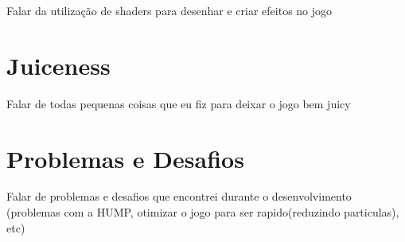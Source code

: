 Falar da utilização de shaders para desenhar e criar efeitos no jogo

\section{Juiceness}
\label{sec:juiceness}

Falar de todas pequenas coisas que eu fiz para deixar o jogo bem juicy

\section{Problemas e Desafios}
\label{sec:problemas_e_desafios}

Falar de problemas e desafios que encontrei durante o desenvolvimento
(problemas com a HUMP, otimizar o jogo para ser rapido(reduzindo particulas), etc)
